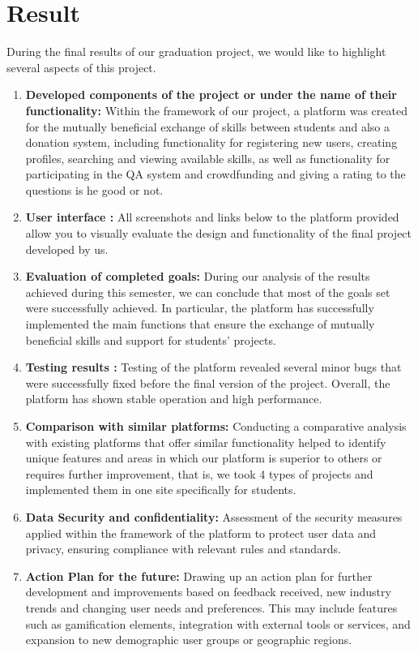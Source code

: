 \chapter{Result}\label{ch:E}
During the final results of our graduation project, we would like to highlight several aspects of this project. 
\begin{enumerate}
    \item \textbf{Developed components of the project or under the name of their functionality:} Within the framework of our project, a platform was created for the mutually beneficial exchange of skills between students and also a donation system, including functionality for registering new users, creating profiles, searching and viewing available skills, as well as functionality for participating in the QA system and crowdfunding and giving a rating to the questions is he good or not. 
    \item \textbf{User interface :} All screenshots and links below to the platform provided allow you to visually evaluate the design and functionality of the final project developed by us.
    \item \textbf{Evaluation of completed goals:} During our analysis of the results achieved during this semester, we can conclude that most of the goals set were successfully achieved. In particular, the platform has successfully implemented the main functions that ensure the exchange of mutually beneficial skills and support for students' projects.
    \item \textbf{Testing results :} Testing of the platform revealed several minor bugs that were successfully fixed before the final version of the project. Overall, the platform has shown stable operation and high performance. 
    \item \textbf{Comparison with similar platforms:} Conducting a comparative analysis with existing platforms that offer similar functionality helped to identify unique features and areas in which our platform is superior to others or requires further improvement, that is, we took 4 types of projects and implemented them in one site specifically for students.
    \item \textbf{Data Security and confidentiality:} Assessment of the security measures applied within the framework of the platform to protect user data and privacy, ensuring compliance with relevant rules and standards. 
    \item \textbf{Action Plan for the future:} Drawing up an action plan for further development and improvements based on feedback received, new industry trends and changing user needs and preferences. This may include features such as gamification elements, integration with external tools or services, and expansion to new demographic user groups or geographic regions.
\end{enumerate}